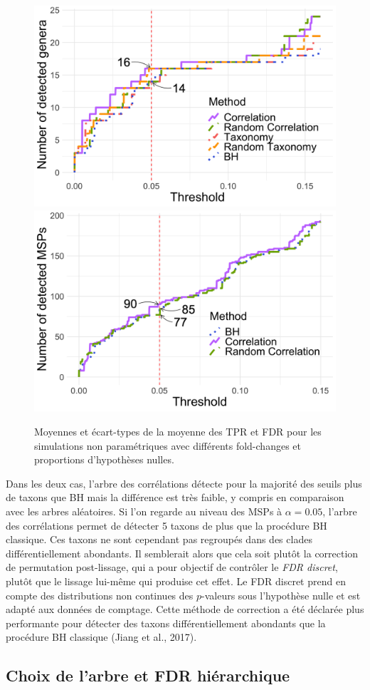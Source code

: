 \documentclass[12pt,a4paper]{reedthesis}
\theoremstyle{definition}
\theoremstyle{definition}
\theoremstyle{definition}
\theoremstyle{remark}
\begin{document}
\begin{figure}[!b]

{\centering \includegraphics[width=0.4\linewidth]{img/zeller_detect_genus} \includegraphics[width=0.4\linewidth]{img/zeller_detect_msp} 

}

\caption{Moyennes et écart-types de la moyenne des TPR et FDR pour les simulations non paramétriques avec différents fold-changes et proportions d'hypothèses nulles.}\label{fig:zellerdetected}
\end{figure}
Dans les deux cas, l'arbre des corrélations détecte pour la majorité des seuils plus de taxons que BH mais la différence est très faible, y compris en comparaison avec les arbres aléatoires. Si l'on regarde au niveau des MSPs à \(\alpha = 0.05\), l'arbre des corrélations permet de détecter 5 taxons de plus que la procédure BH classique. Ces taxons ne sont cependant pas regroupés dans des clades différentiellement abondants. Il semblerait alors que cela soit plutôt la correction de permutation post-lissage, qui a pour objectif de contrôler le \emph{FDR discret}, plutôt que le lissage lui-même qui produise cet effet. Le FDR discret prend en compte des distributions non continues des \(p\)-valeurs sous l'hypothèse nulle et est adapté aux données de comptage. Cette méthode de correction a été déclarée plus performante pour détecter des taxons différentiellement abondants que la procédure BH classique (Jiang et al., 2017).

\hypertarget{choix-de-larbre-et-fdr-hiuxe9rarchique}{%
\subsection{Choix de l'arbre et FDR hiérarchique}\label{choix-de-larbre-et-fdr-hiuxe9rarchique}}
\end{document}
